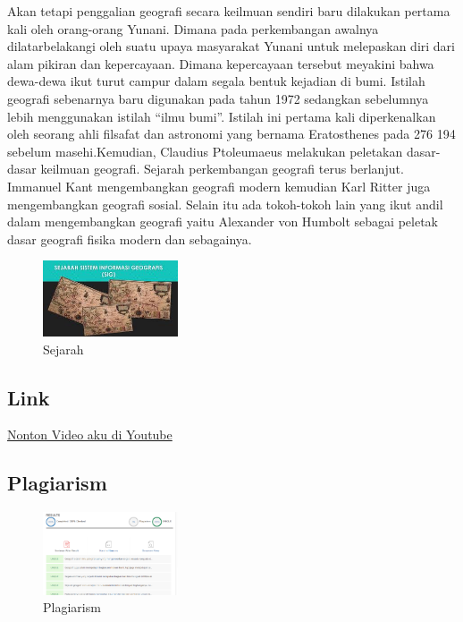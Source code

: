 Akan tetapi penggalian geografi secara keilmuan sendiri baru dilakukan pertama kali oleh orang-orang Yunani. Dimana pada perkembangan awalnya dilatarbelakangi oleh suatu upaya masyarakat Yunani untuk melepaskan diri dari alam pikiran dan kepercayaan. Dimana kepercayaan tersebut meyakini bahwa dewa-dewa ikut turut campur dalam segala bentuk kejadian di bumi.\hfill\break
Istilah geografi sebenarnya baru digunakan pada tahun 1972 sedangkan sebelumnya lebih menggunakan istilah “ilmu bumi”. Istilah ini pertama kali diperkenalkan oleh seorang ahli filsafat dan astronomi yang bernama Eratosthenes pada 276 194 sebelum masehi.Kemudian, Claudius Ptoleumaeus melakukan peletakan dasar-dasar keilmuan geografi.\hfill\break
Sejarah perkembangan geografi terus berlanjut. Immanuel Kant mengembangkan geografi modern kemudian Karl Ritter juga mengembangkan geografi sosial.\hfill\break
Selain itu ada tokoh-tokoh lain yang ikut andil dalam mengembangkan geografi yaitu Alexander von Humbolt sebagai peletak dasar geografi fisika modern dan sebagainya.\hfill\break

\begin{figure}[H]
	\includegraphics[width=4cm]{figures/1174057/sejarah.jpg}
	\centering
	\caption{Sejarah}
\end{figure}

\subsection{Link}
\href{https://www.youtube.com/watch?v=XdUSIKaI3zc}{Nonton Video aku di Youtube}
\subsection{Plagiarism}
\begin{figure}[H]
	\includegraphics[width=4cm]{figures/1174057/plagiarisme.png}
	\centering
	\caption{Plagiarism}
\end{figure}
